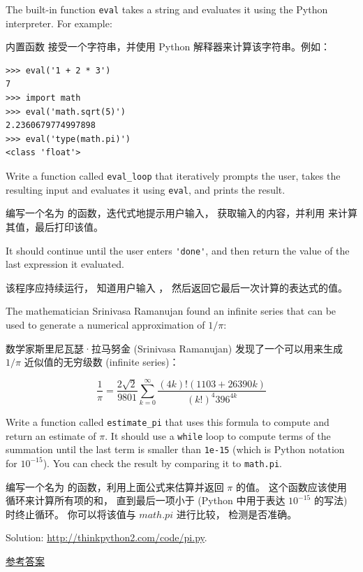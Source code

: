 \begin{exercise}
  

The built-in function {\tt eval} takes a string and evaluates
it using the Python interpreter.  For example:

内置函数 {\em {}} 接受一个字符串，并使用 Python 解释器来计算该字符串。例如：

\begin{lstlisting}
>>> eval('1 + 2 * 3')
7
>>> import math
>>> eval('math.sqrt(5)')
2.2360679774997898
>>> eval('type(math.pi)')
<class 'float'>
\end{lstlisting}

%
Write a function called \verb"eval_loop" that iteratively
prompts the user, takes the resulting input and evaluates
it using {\tt eval}, and prints the result.

编写一个名为 {\em {}} 的函数，迭代式地提示用户输入， 获取输入的内容，并利用 {\em {}} 来计算其值，最后打印该值。

It should continue until the user enters \verb"'done'", and then
return the value of the last expression it evaluated.

该程序应持续运行， 知道用户输入 {\em {}}， 然后返回它最后一次计算的表达式的值。

\end{exercise}


\begin{exercise}

The mathematician Srinivasa Ramanujan found an
infinite series
that can be used to generate a numerical
approximation of $1 / \pi$:

数学家斯里尼瓦瑟·拉马努金 (Srinivasa Ramanujan) 发现了一个可以用来生成 $1 / \pi$
近似值的无穷级数 (infinite series)：

\[ \frac{1}{\pi} = \frac{2\sqrt{2}}{9801}
\sum^\infty_{k=0} \frac{(4k)!(1103+26390k)}{(k!)^4 396^{4k}} \]

Write a function called \verb"estimate_pi" that uses this formula
to compute and return an estimate of $\pi$.  It should use a {\tt while}
loop to compute terms of the summation until the last term is
smaller than {\tt 1e-15} (which is Python notation for $10^{-15}$).
You can check the result by comparing it to {\tt math.pi}.

编写一个名为 {\em {}} 的函数，利用上面公式来估算并返回 $\pi$
的值。 这个函数应该使用  循环来计算所有项的和， 直到最后一项小于 {\em {}} (Python 中用于表达 $10^{-15}$ 的写法) 时终止循环。 你可以将该值与 $math.pi$ 进行比较， 检测是否准确。

Solution: \url{http://thinkpython2.com/code/pi.py}.

\href{http://thinkpython2.com/code/pi.py}{参考答案}

\end{exercise}

